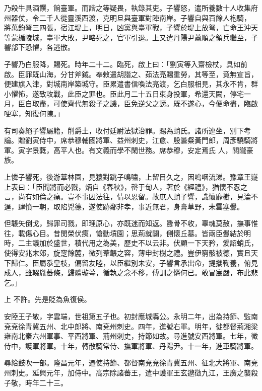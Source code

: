 \begin{pinyinscope}
 乃殺牛具酒饌，餉臺軍。而諧之等疑畏，執錄其吏。子響怒，遣所養數十人收集府州器仗，令二千人從靈溪西渡，克明旦與臺軍對陣南岸。子響自與百餘人袍騎，
 將萬鈞弩三四張，宿江堤上，明日，凶黨與臺軍戰，子響於堤上放弩，亡命王沖天等蒙楯陵城，臺軍大敗，尹略死之，官軍引退。上又遣丹陽尹蕭順之領兵繼至，子響部下恐懼，各逃散。



 子響乃白服降，賜死。時年二十二。臨死，啟上曰：「劉寅等入齋檢杖，具如前啟。臣罪既山海，分甘斧鉞。奉敕遣胡諧之、茹法亮賜重勞，其等至，竟無宣旨，便建旗入津，對城南岸築城守。臣累遣書信喚法亮渡，乞白服相見，其永不肯，群小懼怖，遂致攻戰，此臣之罪也。臣此月二十五日束身投軍，希還天闕，停宅一月，臣自取盡，可使齊代無殺子之譏，臣免逆父之謗。既不遂心，今便命盡，臨啟哽塞，知復何陳。」



 有司奏絕子響屬籍，削爵土，收付廷尉法獄治罪。賜為蛸氏。諸所連坐，別下考論。贈劉寅侍中，席恭穆輔國將軍、益州刺史，江愈、殷曇粲黃門郎，周彥驍騎將軍。寅字景蕤，高平人也。有文義而學不閑世務。席恭穆，安定焉氏
 人，關隴豪族。



 上憐子響死，後游華林園，見猿對跳子鳴嘯，上留目久之，因嗚咽流涕。豫章王嶷上表曰：「臣聞將而必戮，炳自《春秋》，罄于甸人，著於《經禮》，猶懷不忍之言，尚有如倫之痛。豈不事因法往，情以恩留。故庶人蛸子響，識懷靡樹，見淪不逞，肆憤一朝，取陷兇德，遂使跡鄰非孝，事近無君，身膏草野，未雲塞釁。



 但韔矢倒戈，歸罪司戮，即理原心，亦既迷而知返。釁骨不收，辜魂莫赦，撫事惟往，載傷心目。昔閔榮伏痍，愴動墳園；思荊就闢，側懷丘墓。皆兩臣釁結於明時，二主議加於盛世，積代用之為美，歷史不以云非。伏顧一下天矜，爰詔蛸氏，使得安兆末郊，旋窆餘麓，微列葦韔之容，薄申封樹之禮。豈伊窮骸被德，實且天下歸仁。臣屬忝皇枝，偏留友睦，以臣繼別未安，子響言承出命，提攜鞠養，俯見成人，雖輟胤蕃條，歸體璇萼，循執之念不移，傅訓之憐何已。敢冒宸嚴，布此悲乞。」



 上
 不許。先是貶為魚復侯。



 安陸王子敬，字雲端，世祖第五子也。初封應城縣公。永明二年，出為持節、監南兗兗徐青冀五州、北中郎將、南兗州刺史。四年，進號右軍。明年，徙都督荊湘梁雍南北秦六州軍事、平西將軍、荊州刺史，持節如故。尋進號安西將軍。七年，徵侍中，護軍將軍。十年，轉散騎常侍、撫軍將軍、丹陽尹。十一年，進車騎將軍。



 尋給鼓吹一部。隆昌元年，遷使持節、都督南兗兗徐青冀五州、征北大將軍、南兗州刺史。延興元年，加侍中。高宗除諸蕃王，遣中護軍王玄邈徵九江，王廣之襲殺子敬，時年二十三。




\end{pinyinscope}
